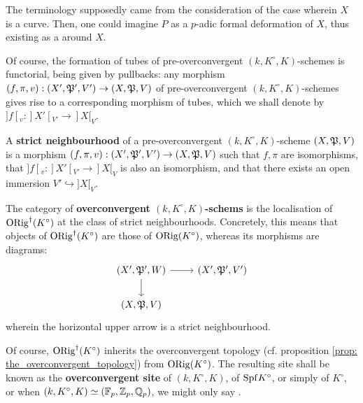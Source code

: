             \begin{remark}
                The terminology supposedly came from the consideration of the case wherein $X$ is a curve. Then, one could imagine $P$ as a $p$-adic formal deformation of $X$, thus existing as a  around $X$. 
            \end{remark}
            \begin{convention}
                Of course, the formation of tubes of pre-overconvergent $(k, K^{\circ}, K)$-schemes is functorial, being given by pullbacks: any morphism $(f, \pi, v): (X', \mathfrak{P}', V') \to (X, \mathfrak{P}, V)$ of pre-overconvergent $(k, K^{\circ}, K)$-schemes gives rise to a corresponding morphism of tubes, which we shall denote by $]f[_v: ]X'[_{V'} \to ]X[_V$.
            \end{convention}
            \begin{definition} \label{def: strict_neighbourhoods_of_pre_overconvergent_schemes}
                A \textbf{strict neighbourhood} of a pre-overconvergent $(k, K^{\circ}, K)$-scheme $(X, \mathfrak{P}, V)$ is a morphism $(f, \pi, v): (X', \mathfrak{P}', V') \to (X, \mathfrak{P}, V)$ such that $f, \pi$ are isomorphisms, that $]f[_v: ]X'[_{V'} \to ]X[_V$ is also an isomorphism, and that there exists an open immersion $V' \hookrightarrow ]X[_V$. 
            \end{definition}
            \begin{definition} \label{def: overconvergent_schemes}
                 The category of \textbf{overconvergent $(k, K^{\circ}, K)$-schems} is the localisation of $\mathrm{ORig}^{\dagger}(K^{\circ})$ at the class of strict neighbourhoods. Concretely, this means that objects of $\mathrm{ORig}^{\dagger}(K^{\circ})$ are those of $\mathrm{ORig}(K^{\circ})$, whereas its morphisms are diagrams:
                    $$
                        \begin{tikzcd}
                        	{(X', \frakP', W)} & {(X', \frakP', V')} \\
                        	{(X, \frakP, V)}
                        	\arrow[from=1-1, to=1-2]
                        	\arrow[from=1-1, to=2-1]
                        \end{tikzcd}
                    $$
                wherein the horizontal upper arrow is a strict neighbourhood. 
            \end{definition}
            \begin{remark}
                Of course, $\mathrm{ORig}^{\dagger}(K^{\circ})$ inherits the overconvergent topology (cf. proposition \ref{prop: the_overconvergent_topology}) from $\mathrm{ORig}(K^{\circ})$. The resulting site shall be known as the \textbf{overconvergent site} of $(k, K^{\circ}, K)$, of $\mathrm{Spf} K^{\circ}$, or simply of $K^{\circ}$, or when $(k, K^{\circ}, K) \simeq (\mathbb{F}_p, \mathbb{Z}_p, \mathbb{Q}_p)$, we might only say .
            \end{remark}
